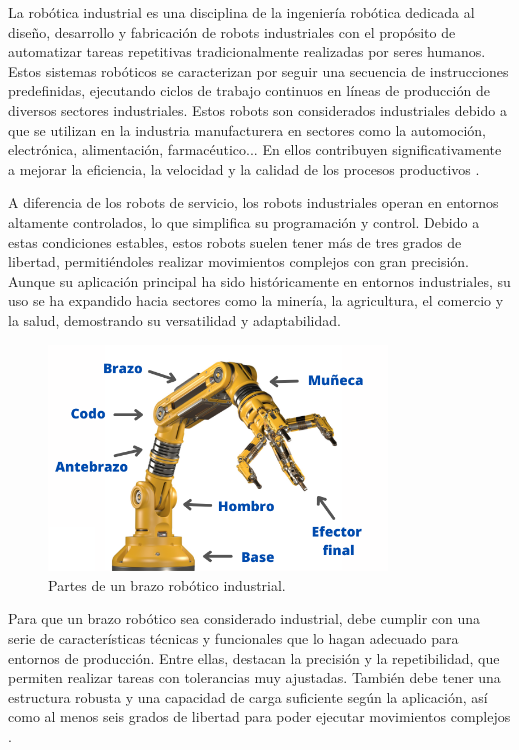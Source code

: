 La robótica industrial es una disciplina de la ingeniería robótica dedicada al diseño, desarrollo y fabricación de robots industriales con el propósito de automatizar tareas repetitivas tradicionalmente realizadas por seres humanos. Estos sistemas robóticos se caracterizan por seguir una secuencia de instrucciones predefinidas, ejecutando ciclos de trabajo continuos en líneas de producción de diversos sectores industriales. Estos robots son considerados industriales debido a que se utilizan en la industria manufacturera en sectores como la automoción, electrónica, alimentación, farmacéutico... En ellos contribuyen significativamente a mejorar la eficiencia, la velocidad y la calidad de los procesos productivos \cite{info_robotica_industrial_1}. 

A diferencia de los robots de servicio, los robots industriales operan en entornos altamente controlados, lo que simplifica su programación y control. Debido a estas condiciones estables, estos robots suelen tener más de tres grados de libertad, permitiéndoles realizar movimientos complejos con gran precisión. Aunque su aplicación principal ha sido históricamente en entornos industriales, su uso se ha expandido hacia sectores como la minería, la agricultura, el comercio y la salud, demostrando su versatilidad y adaptabilidad. \\

\begin{figure} [h!]
  \begin{center}
    \includegraphics[width=9cm]{figs/brazo_industrial}
  \end{center}
  \caption{\centering Partes de un brazo robótico industrial.}
  \label{fig:brazo_industrials}
\end{figure}

Para que un brazo robótico sea considerado industrial, debe cumplir con una serie de características técnicas y funcionales que lo hagan adecuado para entornos de producción. Entre ellas, destacan la precisión y la repetibilidad, que permiten realizar tareas con tolerancias muy ajustadas. También debe tener una estructura robusta y una capacidad de carga suficiente según la aplicación, así como al menos seis grados de libertad para poder ejecutar movimientos complejos \cite{brazo_industrial}.

